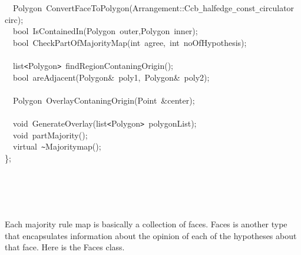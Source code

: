 \documentclass[a4paper,10pt]{article}
\begin{document}
{\jttstylea ~~\jttstylek Polygon~ConvertFaceToPolygon\jttstylei (\jttstylek Arrangement::Ccb\verb#_#halfedge\verb#_#const\verb#_#circulator~circ\jttstylei )\jttstylek ;\\
\jttstylea ~~\jttstylek bool~IsContainedIn\jttstylei (\jttstylek Polygon~outer,Polygon~inner\jttstylei )\jttstylek ;\\
\jttstylea ~~\jttstylek bool~CheckPartOfMajorityMap\jttstylei (\jttstylej int~\jttstylek agree,~\jttstylej int~\jttstylek noOfHypothesis\jttstylei )\jttstylek ;\\
\jttstylea \\
\jttstylea ~~\jttstylek list\verb#<#Polygon\verb#>#~findRegionContaningOrigin\jttstylei ()\jttstylek ;\\
\jttstylea ~~\jttstylek bool~areAdjacent\jttstylei (\jttstylek Polygon\&~poly1,~Polygon\&~poly2\jttstylei )\jttstylek ;\\
\jttstylea \\
\jttstylea ~~\jttstylek Polygon~OverlayContaningOrigin\jttstylei (\jttstylek Point~\&center\jttstylei )\jttstylek ;\\
\jttstylea \\
\jttstylea ~~\jttstylej void~\jttstylek GenerateOverlay\jttstylei (\jttstylek list\verb#<#Polygon\verb#>#~polygonList\jttstylei )\jttstylek ;\\
\jttstylea ~~\jttstylej void~\jttstylek partMajority\jttstylei ()\jttstylek ;\\
\jttstylea ~~\jttstylek virtual~\verb#~#Majoritymap\jttstylei ()\jttstylek ;\\
\jttstylei \}\jttstylek ;\\
\jttstylea \\
\jttstylea \\
\jttstylea \\
\jttstylea \jttstylea 
\\

}

Each majority rule map is basically a collection of faces. Faces is another type that encapsulates information about the opinion of 
each of the hypotheses about that face. Here is the Faces class.
\end{document}
